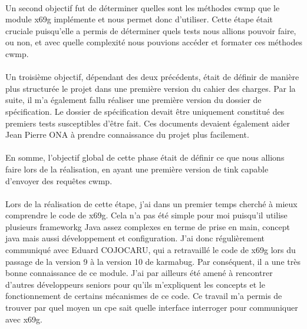 \documentclass[12pt,a4paper]{report}
\begin{document}
\paragraph*{}Un second objectif fut de déterminer quelles sont les méthodes \gls{cwmp}
que le module \gls{x69g} implémente et nous permet donc d’utiliser. Cette étape était cruciale puisqu’elle a permis de déterminer quels tests nous allions pouvoir faire, ou non, et avec quelle complexité nous pouvions accéder et formater ces méthodes \gls{cwmp}.
\paragraph*{}Un troisième objectif, dépendant des deux précédents, était de définir de
manière plus structurée le projet dans une première version du cahier des charges. Par la suite, il m’a également fallu réaliser une première version du dossier de spécification. Le dossier de spécification devait être uniquement constitué des premiers tests susceptibles d’être fait. Ces documents devaient également aider Jean Pierre ONA à prendre connaissance du projet plus facilement.
\paragraph*{}En somme, l’objectif global de cette phase était de définir ce que nous
allions faire lors de la réalisation, en ayant une première version de \gls{tink} capable d’envoyer des requêtes \gls{cwmp}.
\paragraph*{}Lors de la réalisation de cette étape, j’ai dans un premier temps cherché
à mieux comprendre le code de \gls{x69g}. Cela n’a pas été simple pour moi puisqu’il utilise plusieurs \gls{frameworkg} Java assez complexes en terme de prise en main, concept java mais aussi développement et configuration. J’ai donc régulièrement communiqué avec Eduard COJOCARU, qui a retravaillé le code de \gls{x69g} lors du passage de la version 9 à la version 10 de \gls{karmabug}. Par conséquent, il a une très bonne connaissance de ce module. J’ai par ailleurs été amené à rencontrer d’autres développeurs seniors pour qu’ils m’expliquent les concepts et le fonctionnement de certains mécanismes de ce code. Ce travail m’a permis de trouver par quel moyen un \gls{cpe} sait quelle interface interroger pour communiquer avec \gls{x69g}.
\end{document}
